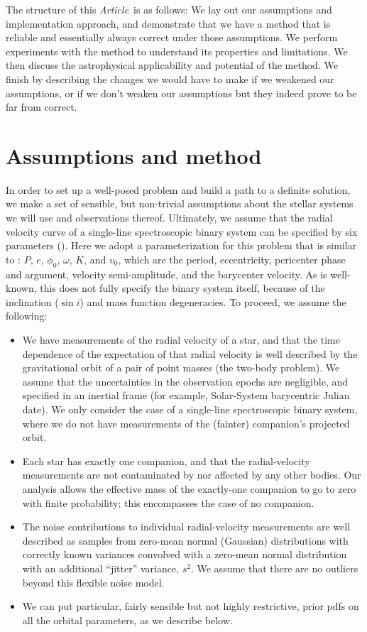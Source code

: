\documentclass[manuscript, letterpaper]{aastex6}
\newcommand{\documentname}{\textsl{Article}}
\newcommand{\resp}[1]{{\color{mahogany}#1}}
\begin{document}
The structure of this \documentname\ is as follows:
We lay out our assumptions and implementation approach, and demonstrate that we
have a method that is reliable and essentially always correct under
those assumptions.
We perform experiments with the method to understand its properties and
limitations.
We then discuss the astrophysical applicability and potential of the
method.
We finish by describing the changes we would have to make if we weakened our assumptions, or
if we don't weaken our assumptions but they indeed prove to be far from correct.

\section{Assumptions and method} \label{sec:method}

In order to set up a well-posed problem and build a path to a definite solution,
we make a set of sensible, but non-trivial assumptions about the stellar systems we will use
and observations thereof.
Ultimately, we assume that the radial velocity curve of a single-line
spectroscopic binary system can be specified by six parameters
(\citealt{Kepler:1609}).
Here we adopt a parameterization for this problem that is similar to
\citealt{Murray:2010}:
$P$, $e$, $\phi_0$, $\omega$, $K$, and $v_0$, which are the period,
eccentricity, pericenter phase and argument, velocity semi-amplitude, and the
barycenter velocity.
As is well-known, this does not fully specify the binary system itself, because
of the inclination ($\sin{i}$) and mass function degeneracies.
To proceed, we assume the following:
\begin{itemize}\itemsep0ex  %
\item We have measurements of the radial velocity of a
  star, and that the time dependence of the expectation of that radial
  velocity is well described by the gravitational orbit of a pair of
  point masses (the two-body problem). We assume that the uncertainties
  in the observation epochs are negligible, and specified in an inertial frame (for
  example, Solar-System barycentric Julian date).
  We only consider the case of a single-line spectroscopic binary system,
  where we do not have measurements of the (fainter) companion's projected orbit.
\item  Each star has exactly one companion, and that the radial-velocity
  measurements are not contaminated by nor affected by any other bodies. Our
  analysis allows the effective mass of the exactly-one companion to go to zero
  \resp{with finite probability}; this encompasses the case of no companion.
\item The noise contributions to individual radial-velocity measurements are
  well described as \resp{samples} from zero-mean normal (Gaussian)
  distributions with correctly known variances convolved with a zero-mean normal
  distribution with an additional ``jitter'' variance, $s^2$. We assume that
  there are no outliers beyond this flexible noise model.
\item We can put particular, fairly sensible but not highly restrictive,
  prior pdfs on all the orbital parameters, as we
  describe below.
\end{itemize}
\end{document}
